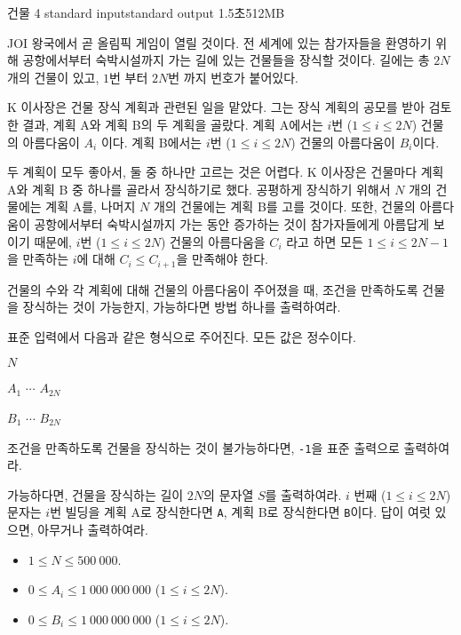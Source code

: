 \begin{problem}{건물 4}
	{standard input}{standard output}
	{1.5초}{512MB}{}
	
	JOI 왕국에서 곧 올림픽 게임이 열릴 것이다. 전 세계에 있는 참가자들을 환영하기 위해 공항에서부터 숙박시설까지 가는 길에 있는 건물들을 장식할 것이다. 길에는 총 $2N$ 개의 건물이 있고, $1$번 부터 $2N$번 까지 번호가 붙어있다.
	
	K 이사장은 건물 장식 계획과 관련된 일을 맡았다. 그는 장식 계획의 공모를 받아 검토한 결과, 계획 A와 계획 B의 두 계획을 골랐다. 계획 A에서는 $i$번 ($1 \le i \le 2N$) 건물의 아름다움이 $A_i$ 이다. 계획 B에서는 $i$번 ($1 \le i \le 2N$) 건물의 아름다움이 $B_i$이다.
	
	두 계획이 모두 좋아서, 둘 중 하나만 고르는 것은 어렵다. K 이사장은 건물마다 계획 A와 계획 B 중 하나를 골라서 장식하기로 했다. 공평하게 장식하기 위해서 $N$ 개의 건물에는 계획 A를, 나머지 $N$ 개의 건물에는 계획 B를 고를 것이다. 또한, 건물의 아름다움이 공항에서부터 숙박시설까지 가는 동안 증가하는 것이 참가자들에게 아름답게 보이기 때문에, $i$번 ($1 \le i \le 2N$) 건물의 아름다움을 $C_i$ 라고 하면 모든 $1 \le i \le 2N-1$을 만족하는 $i$에 대해 $C_i \le C_{i+1}$을 만족해야 한다.
	
	건물의 수와 각 계획에 대해 건물의 아름다움이 주어졌을 때, 조건을 만족하도록 건물을 장식하는 것이 가능한지, 가능하다면 방법 하나를 출력하여라.
	
	\InputFile
	
	표준 입력에서 다음과 같은 형식으로 주어진다. 모든 값은 정수이다.

	$N$
	
	$A_1$ $\cdots$ $A_{2N}$
	
	$B_1$ $\cdots$ $B_{2N}$
	
	\OutputFile
	
	조건을 만족하도록 건물을 장식하는 것이 불가능하다면, \texttt{-1}을 표준 출력으로 출력하여라.
	
	가능하다면, 건물을 장식하는 길이 $2N$의 문자열 $S$를 출력하여라. $i$ 번째 ($1 \le i \le 2N$) 문자는 $i$번 빌딩을 계획 A로 장식한다면 \texttt{A}, 계획 B로 장식한다면 \texttt{B}이다. 답이 여럿 있으면, 아무거나 출력하여라.
	
	\Constraints
	
	\begin{itemize}
	\item $1 \le N \le 500\ 000$.
	\item $0 \le A_i \le 1\ 000\ 000\ 000$ ($1 \le i \le 2N$).
	\item $0 \le B_i \le 1\ 000\ 000\ 000$ ($1 \le i \le 2N$).
	\end{itemize}
	

\end{problem}
